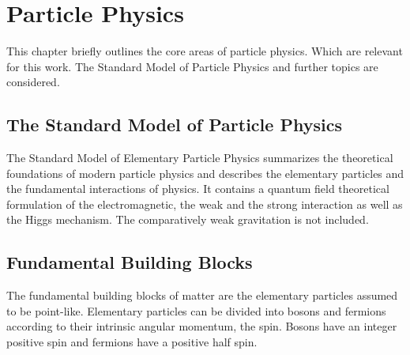 \documentclass[12pt, a4paper]{thesis}
\begin{document}
\chapter{Particle Physics}
\label{sec:orgcd2d7c7}
This chapter briefly outlines the core areas of particle
physics. Which are relevant for this work. The Standard Model of
Particle Physics and further topics are considered.

\section{The Standard Model of Particle Physics}
\label{sec:org862e92f}
The Standard Model of Elementary Particle Physics summarizes the
theoretical foundations of modern particle physics and describes the
elementary particles and the fundamental interactions of physics. It
contains a quantum field theoretical formulation of the
electromagnetic, the weak and the strong interaction as well as the
Higgs mechanism. The comparatively weak gravitation is not included.

\section{Fundamental Building Blocks}
\label{sec:org4008fdf}
The fundamental building blocks of matter are the elementary particles assumed
to be point-like. Elementary particles can be divided into bosons and fermions
according to their intrinsic angular momentum, the spin. Bosons have
an integer positive spin and fermions have a positive half spin.
\end{document}
